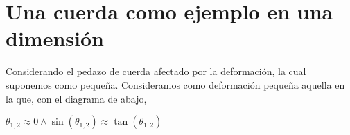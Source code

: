 \section{ Una cuerda como ejemplo en una dimensión }

\begin{center}
\end{center}

Considerando el pedazo de cuerda afectado por la deformación,
la cual suponemos como pequeña. Consideramos como deformación
pequeña aquella en la que, con el diagrama de abajo,

\(\theta_{1,2} \approx 0 \land \sin(\theta_{1,2}) \approx \tan(\theta_{1,2})\)


